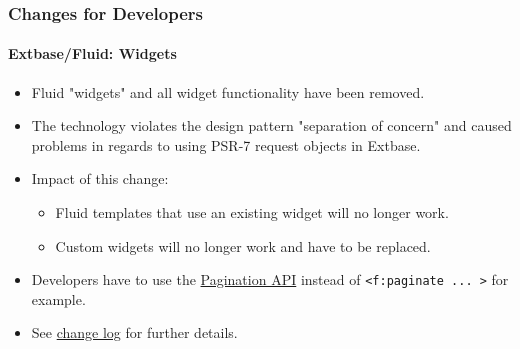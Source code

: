 %

\begin{frame}[fragile]
	\frametitle{Changes for Developers}
	\framesubtitle{Extbase/Fluid: Widgets}


	\begin{itemize}
		\item Fluid "widgets" and all widget functionality have been removed.
		\item The technology violates the design pattern "separation of concern"
			and caused problems in regards to using PSR-7 request objects in Extbase.
		\item Impact of this change:
			\begin{itemize}
				\item Fluid templates that use an existing widget will no longer work.
				\item Custom widgets will no longer work and have to be replaced.
			\end{itemize}
		\item Developers have to use the
			\href{https://docs.typo3.org/m/typo3/reference-coreapi/master/en-us/ApiOverview/Pagination/Index.html}{Pagination API}
			instead of\newline
			\small\texttt{<f:paginate ... >}\normalsize
			for example.
		\item See \href{https://docs.typo3.org/c/typo3/cms-core/master/en-us/Changelog/10.0/Breaking-92529-AllFluidWidgetFunctionalityRemoved.html}{change log}
			for further details.
	\end{itemize}

\end{frame}

